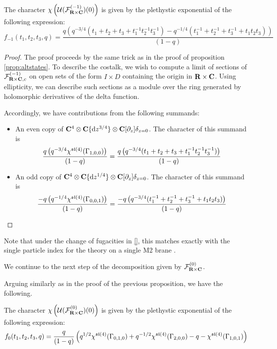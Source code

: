 \documentclass[../main.tex]{subfiles}
\begin{document}
\begin{prop}
The character $\chi \left ( \mathcal{U}(\mathcal{F}_{\mathbf{R}\times \mathbf{C}}^{(-1)})(0)\right )$ is given by the plethystic exponential of the following expression:
\begin{equation}
f_{-1}(t_1, t_2, t_3, q) = \frac{q\left (q^{-3/4}(t_1+ t_2+t_3 + t_1^{-1} t_2^{-1} t_3^{-1} )-q^{-1/4}(t_1^{-1} + t_2^{-1}+t_3^{-1} + t_1t_2t_3)\right )}{(1-q)}
\end{equation}
\end{prop}
\begin{proof}
The proof proceeds by the same trick as in the proof of proposition \ref{prop:altstates}. To describe the costalk, we wish to compute a limit of sections of $\mathcal{F}^{(-1)}_{\mathbf{R}\times \mathbf{C},c}$ on open sets of the form $I\times D$ containing the origin in $\mathbf{R}\times \mathbf{C}$. Using ellipticity, we can describe such sections as a module over the ring generated by holomorphic derivatives of the delta function. 

Accordingly, we have contributions from the following summands:
\begin{itemize}
\item An even copy of $\mathbf{C}^4\otimes \mathbf{C}\{\mathrm{d} z^{3/4}\} \otimes \mathbf{C}[\partial_z]\delta_{z=0}$. The character of this summand is
\[
\frac{q\left (q^{-3/4}\chi^{\mathfrak{sl}(4)}(\Gamma_{1,0,0}) \right )}{(1-q)} =\frac{q\left (q^{-3/4}(t_1+ t_2+t_3 + t_1^{-1} t_2^{-1} t_3^{-1} )\right )}{(1-q)}
\]
\item An odd copy of $\mathbf{C}^4\otimes \mathbf{C}\{\mathrm{d} z^{1/4}\} \otimes \mathbf{C}[\partial_z]\delta_{z=0}$. The character of this summand is
\[
\frac{-q\left (q^{-1/4}\chi^{\mathfrak{sl}(4)}(\Gamma_{0,0,1}) \right )}{(1-q)} =\frac{-q\left (q^{-3/4}(t_1^{-1} + t_2^{-1} +t_3^{-1}  + t_1 t_2 t_3)\right )}{(1-q)}
\]
\end{itemize}
\end{proof}

Note that under the change of fugacities in \ref{}, this matches exactly with the single particle index for the theory on a single M2 brane \cite[Eq. (2.32)]{Bhattacharya:2008zy}.

\parsec[]
We continue to the next step of the decomposition given by $\mathcal{F}^{(0)}_{\mathbf{R}\times \mathbf{C}}$. 

Arguing similarly as in the proof of the previous proposition, we have the following.
\begin{prop}
The character $\chi \left ( \mathcal{U} (\mathcal{F}^{(0)}_{\mathbf{R}\times \mathbf{C}})(0)\right )$ is given by the plethystic exponential of the following expression:
\begin{equation}
f_0(t_1, t_2, t_3, q) = \frac{q}{(1-q)}\left ( q^{1/2}\chi^{\mathfrak{sl}(4)}(\Gamma_{0,1,0})  + q^{-1/2}\chi^{\mathfrak{sl}(4)}(\Gamma_{2,0,0})  - q - \chi^{\mathfrak{sl}(4)}(\Gamma_{1,0,1}) \right)
\end{equation}
\end{prop}
\end{document}
